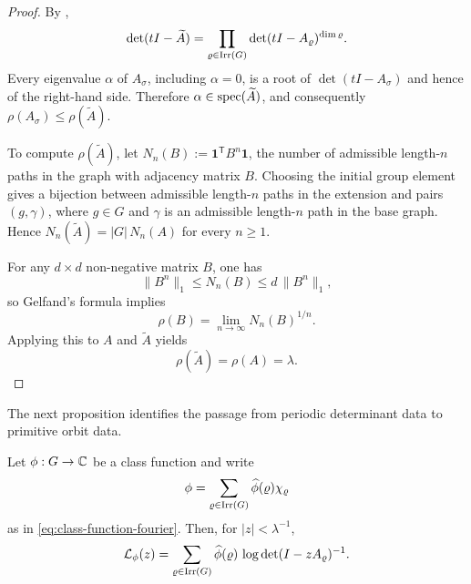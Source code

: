 \begin{proof}
  By ,
  \[
    \det(tI-\widetilde A)
    =
    \prod_{\varrho\in\operatorname{Irr}(G)}
      \det(tI-A_\varrho)^{\dim\varrho}.
  \]
  Every eigenvalue \(\alpha\) of \(A_\sigma\), including \(\alpha=0\),
  is a root of \(\det(tI-A_\sigma)\) and hence of the right-hand
  side. Therefore \(\alpha\in\operatorname{spec}(\widetilde A)\), and consequently
  \(\rho(A_\sigma)\le \rho(\widetilde A)\).

  To compute \(\rho(\widetilde A)\), let
  \(N_n(B):=\mathbf 1^{\mathsf T}B^n\mathbf 1\), the number of
  admissible length-\(n\) paths in the graph with adjacency matrix
  \(B\). Choosing the initial group element gives a bijection between
  admissible length-\(n\) paths in the extension and pairs
  \((g,\gamma)\), where \(g\in G\) and \(\gamma\) is an admissible
  length-\(n\) path in the base graph. Hence
  \(N_n(\widetilde A)=|G|\,N_n(A)\) for every \(n\ge 1\).

  For any \(d\times d\) non-negative matrix \(B\), one has
  \[
    \|B^n\|_1\le N_n(B)\le d\,\|B^n\|_1,
  \]
  so Gelfand's formula implies
  \[
    \rho(B)=\lim_{n\to\infty}N_n(B)^{1/n}.
  \]
  Applying this to \(A\) and \(\widetilde A\) yields
  \[
    \rho(\widetilde A)=\rho(A)=\lambda.
  \]
\end{proof}

The next proposition identifies the passage from periodic determinant
data to primitive orbit data.

\begin{proposition}
  \label{thm:class-function-linearisation}
  Let \(\phi:G\to\mathbb{C}\) be a class function and write
  \[
    \phi=\sum_{\varrho\in\operatorname{Irr}(G)}\widehat\phi(\varrho)\chi_\varrho
  \]
  as in \eqref{eq:class-function-fourier}. Then, for \(|z|<\lambda^{-1}\),
  \begin{equation}\label{eq:class-logarithm-determinant-linearisation}
    \mathcal L_\phi(z)
    =
    \sum_{\varrho\in\operatorname{Irr}(G)}
      \widehat\phi(\varrho)\,
      \log\det(I-zA_\varrho)^{-1}.
  \end{equation}
\end{proposition}

